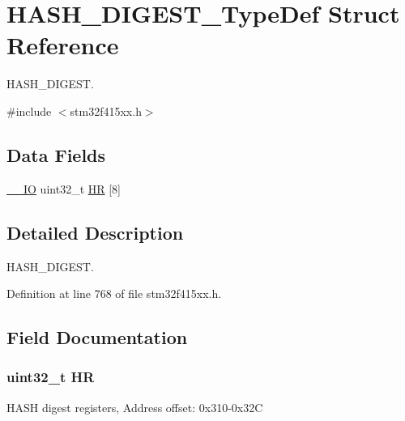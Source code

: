 \hypertarget{struct_h_a_s_h___d_i_g_e_s_t___type_def}{}\section{H\+A\+S\+H\+\_\+\+D\+I\+G\+E\+S\+T\+\_\+\+Type\+Def Struct Reference}
\label{struct_h_a_s_h___d_i_g_e_s_t___type_def}


H\+A\+S\+H\+\_\+\+D\+I\+G\+E\+ST.  




{\ttfamily \#include $<$stm32f415xx.\+h$>$}

\subsection*{Data Fields}
\begin{DoxyCompactItemize}
\item 
\hyperlink{core__sc300_8h_aec43007d9998a0a0e01faede4133d6be}{\+\_\+\+\_\+\+IO} uint32\+\_\+t \hyperlink{struct_h_a_s_h___d_i_g_e_s_t___type_def_ac8e340037eafde8a99653f8b15ee0338}{HR} \mbox{[}8\mbox{]}
\end{DoxyCompactItemize}


\subsection{Detailed Description}
H\+A\+S\+H\+\_\+\+D\+I\+G\+E\+ST. 

Definition at line 768 of file stm32f415xx.\+h.



\subsection{Field Documentation}
\subsubsection[{\texorpdfstring{HR}{HR}}]{ uint32\+\_\+t HR}\hypertarget{struct_h_a_s_h___d_i_g_e_s_t___type_def_ac8e340037eafde8a99653f8b15ee0338}{}\label{struct_h_a_s_h___d_i_g_e_s_t___type_def_ac8e340037eafde8a99653f8b15ee0338}
H\+A\+SH digest registers, Address offset\+: 0x310-\/0x32C 

